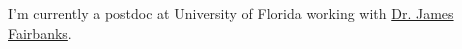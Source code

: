 I'm currently a postdoc at University of Florida working with \href{http://jpfairbanks.com/}{Dr. James Fairbanks}.